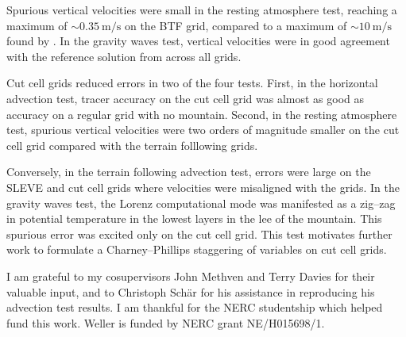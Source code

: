 \documentclass[twocol]{ametsoc}
\begin{document}
Spurious vertical velocities were small in the resting atmosphere test, reaching a maximum of $\sim \SI{0.35}{\meter\per\second}$ on the BTF grid, compared to a maximum of $\sim \SI{10}{\meter\per\second}$ found by \citet{klemp2011}.  In the gravity waves test, vertical velocities were in good agreement with the reference solution from \citet{melvin2010} across all grids.

Cut cell grids reduced errors in two of the four tests.  First, in the horizontal advection test, tracer accuracy on the cut cell grid was almost as good as accuracy on a regular grid with no mountain.  Second, in the resting atmosphere test, spurious vertical velocities were two orders of magnitude smaller on the cut cell grid compared with the terrain folllowing grids.

Conversely, in the terrain following advection test, errors were large on the SLEVE and cut cell grids where velocities were misaligned with the grids.  In the gravity waves test, the Lorenz computational mode was manifested as a zig--zag in potential temperature in the lowest layers in the lee of the mountain.  This spurious error was excited only on the cut cell grid.  This test motivates further work to formulate a Charney--Phillips staggering of variables on cut cell grids.

\acknowledgments
I am grateful to my cosupervisors John Methven and Terry Davies for their valuable input, and to Christoph Sch\"{a}r for his assistance in reproducing his advection test results.  I am thankful for the NERC studentship which helped fund this work.  Weller is funded by NERC grant NE/H015698/1.







\end{document}
